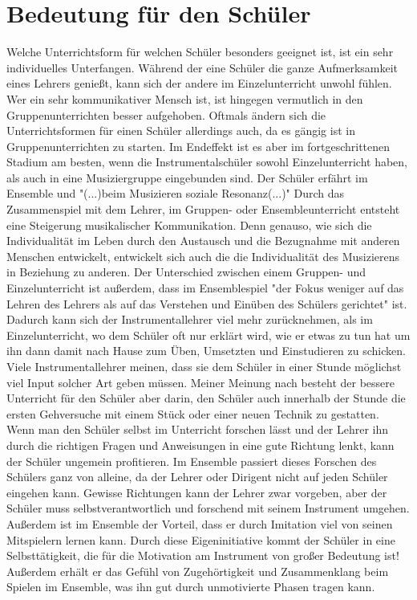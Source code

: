\section{Bedeutung für den Schüler}
Welche Unterrichtsform für welchen Schüler besonders geeignet ist, ist ein sehr
individuelles Unterfangen. Während der eine Schüler die ganze Aufmerksamkeit
eines Lehrers genießt, kann sich der andere im Einzelunterricht unwohl fühlen.
Wer ein sehr kommunikativer Mensch ist, ist hingegen vermutlich in den
Gruppenunterrichten besser aufgehoben. Oftmals ändern sich die Unterrichtsformen
für einen Schüler allerdings auch, da es gängig ist in Gruppenunterrichten zu
starten. Im
Endeffekt ist es aber im fortgeschrittenen Stadium am besten, wenn die
Instrumentalschüler sowohl Einzelunterricht haben, als auch in eine
Musiziergruppe eingebunden sind. Der Schüler erfährt im Ensemble und "(...)beim
Musizieren soziale Resonanz(...)" \autocite[28]{mitzscherlich:musikpsychologie}
Durch das Zusammenspiel mit dem Lehrer, im Gruppen- oder Ensembleunterricht
entsteht eine Steigerung musikalischer Kommunikation.
\autocite[99]{mitzscherlich:musikpsychologie} Denn genauso, wie sich die
Individualität im Leben durch den Austausch und die Bezugnahme mit anderen
Menschen entwickelt, entwickelt sich auch die die Individualität des Musizierens
in Beziehung zu anderen. Der Unterschied zwischen einem Gruppen- und
Einzelunterricht ist außerdem, dass im Ensemblespiel "der Fokus weniger auf das
Lehren des Lehrers als auf das Verstehen und Einüben des Schülers gerichtet"
ist. \autocite[31]{losert:die_kunst_zu_unterrichten} Dadurch kann sich der
Instrumentallehrer viel mehr zurücknehmen, als im Einzelunterricht, wo dem
Schüler oft nur erklärt wird, wie er etwas zu tun hat um ihn dann damit nach
Hause zum Üben, Umsetzten und Einstudieren zu schicken. Viele Instrumentallehrer
meinen, dass sie dem Schüler in einer Stunde möglichst viel Input solcher Art
geben müssen. Meiner Meinung nach besteht der bessere Unterricht für den Schüler
aber darin, den Schüler auch innerhalb der Stunde die ersten Gehversuche mit
einem Stück oder einer neuen Technik zu gestatten. Wenn man den Schüler selbst
im Unterricht forschen lässt und der Lehrer ihn durch die richtigen Fragen und
Anweisungen in eine gute Richtung lenkt, kann der Schüler ungemein profitieren.
Im Ensemble passiert dieses Forschen des Schülers ganz von alleine, da der
Lehrer oder Dirigent nicht auf jeden Schüler eingehen kann. Gewisse Richtungen
kann der Lehrer zwar vorgeben, aber der Schüler muss selbstverantwortlich und
forschend mit seinem Instrument umgehen. Außerdem ist im Ensemble der Vorteil,
dass er durch Imitation viel von seinen Mitspielern lernen kann. Durch diese
Eigeninitiative kommt der Schüler in eine Selbsttätigkeit, die für die
Motivation am Instrument von großer Bedeutung ist! Außerdem erhält er das Gefühl
von Zugehörtigkeit und Zusammenklang beim Spielen im Ensemble, was ihn gut durch
unmotivierte Phasen tragen kann.

